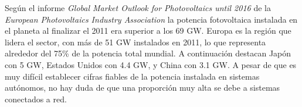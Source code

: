 Según el informe \emph{Global Market Outlook for Photovoltaics until
2016} de la \emph{European Photovoltaics Industry Association}
\cite{EPIA2012} la potencia fotovoltaica instalada en el planeta
al finalizar el 2011 era superior a los 69 GW. Europa es la región
que lidera el sector, con más de 51 GW instalados en 2011, lo que
representa alrededor del 75\% de la potencia total mundial. A
continuación destacan Japón con 5 GW, Estados Unidos con 4.4 GW, y
China con 3.1 GW. A pesar de que es muy difícil establecer
cifras fiables de la potencia instalada en sistemas autónomos, no
hay duda de que una proporción muy alta se debe a sistemas conectados
a red. 

